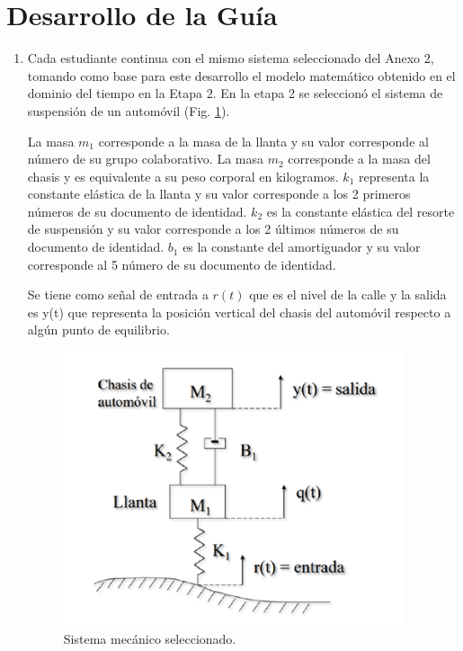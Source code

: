 \documentclass{article}
\begin{document}
\section{Desarrollo de la Guía}
\begin{enumerate}
  \item Cada estudiante continua con el mismo sistema seleccionado del Anexo 2, tomando como base para este desarrollo el modelo matemático obtenido en el dominio del tiempo en la Etapa 2.
  En la etapa 2 se seleccionó el sistema de suspensión de un automóvil (Fig. \ref{fig:sistema_mecanico}).

  La masa $m_1$ corresponde a la masa de la llanta y su valor corresponde al número de su grupo colaborativo. La masa $m_2$ corresponde a la masa del chasis y es equivalente a su peso corporal en kilogramos. $k_1$ representa la constante elástica de la llanta y su valor corresponde a los 2 primeros números de su documento de identidad. $k_2$ es la constante elástica del resorte de suspensión y su valor corresponde a los 2 últimos números de su documento de identidad. $b_1$ es la constante del amortiguador y su valor corresponde al 5 número de su documento de identidad.

  Se tiene como señal de entrada a $r(t)$ que es el nivel de la calle y la salida es y(t) que representa la posición vertical del chasis del automóvil respecto a algún punto de equilibrio.

  \lipsum[3-4] \cite{sternberg2010dynamical}

  \begin{figure}
    \centering
    \includegraphics[width=10cm]{img/sistema.png}
    \caption{Sistema mecánico seleccionado.}
    \label{fig:sistema_mecanico}
  \end{figure}


\end{enumerate}
\end{document}
